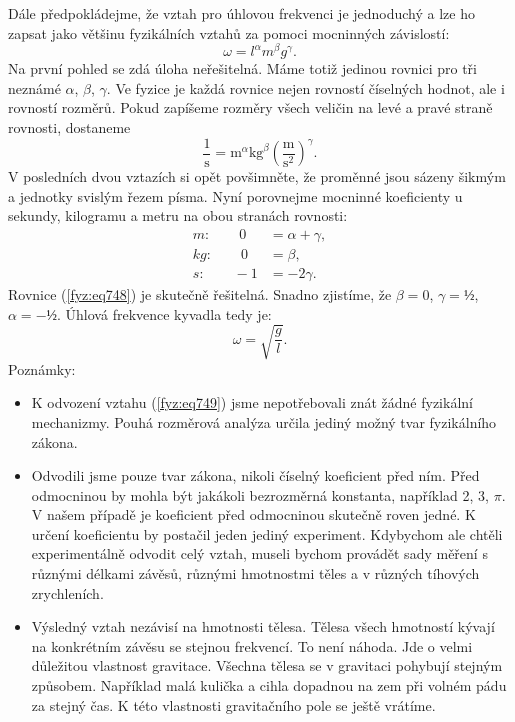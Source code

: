 \begin{mdframed}[style=mdexam]
\begin{example}
    Dále předpokládejme, že vztah pro úhlovou frekvenci je jednoduchý a lze ho zapsat jako většinu
    fyzikálních vztahů za pomoci mocninných závislostí:
    \begin{equation*}
      ω= l^\alpha m^\beta g^\gamma.     
    \end{equation*}
    Na první pohled se zdá úloha neřešitelná. Máme totiž jedinou rovnici pro tři neznámé \(α\),
    \(β\), \(γ\). Ve fyzice je každá rovnice nejen rovností číselných hodnot, ale i rovností
    rozměrů. Pokud zapíšeme rozměry všech veličin na levé a pravé straně rovnosti, dostaneme
    \begin{equation}\label{fyz:eq748}
      \dfrac{1}{\si{\s}} = \si{\m}^α\si{\kg}^β\left(\dfrac{\si{\m}}{\si{\square\s}}\right)^γ.
    \end{equation}
    V posledních dvou vztazích si opět povšimněte, že proměnné jsou sázeny šikmým a jednotky
    svislým řezem písma. Nyní porovnejme mocninné koeficienty u sekundy, kilogramu a metru
    na obou stranách rovnosti:
    \begin{align*}
      \si{m}:  \qquad 0 &= α + γ, \\
      \si{kg}: \qquad 0 &= β,     \\
      \si{s}:  \qquad-1 &= -2γ.
    \end{align*}
    Rovnice (\ref{fyz:eq748}) je skutečně řešitelná. Snadno zjistíme, že \(β = 0\), \(γ = ½\), \(α =
    −½\). Úhlová frekvence kyvadla tedy je: 
    \begin{equation}\label{fyz:eq749}
      ω=\sqrt{\dfrac{g}{l}}.
    \end{equation}
    Poznámky:
    \begin{itemize}[noitemsep]
      \item K odvození vztahu (\ref{fyz:eq749}) jsme nepotřebovali znát žádné fyzikální mechanizmy.
            Pouhá rozměrová analýza určila jediný možný tvar fyzikálního zákona.
      \item Odvodili jsme pouze tvar zákona, nikoli číselný koeficient před ním. Před odmocninou by
            mohla být jakákoli bezrozměrná konstanta, například \num{2}, \num{3}, \(π\). V našem
            případě je koeficient před odmocninou skutečně roven jedné. K určení koeficientu by
            postačil jeden jediný experiment. Kdybychom ale chtěli experimentálně odvodit celý
            vztah, museli bychom provádět sady měření s různými délkami závěsů, různými hmotnostmi
            těles a v různých tíhových zrychleních.
      \item Výsledný vztah nezávisí na hmotnosti tělesa. Tělesa všech hmotností kývají na konkrétním
            závěsu se stejnou frekvencí. To není náhoda. Jde o velmi důležitou vlastnost gravitace.
            Všechna tělesa se v gravitaci pohybují stejným způsobem. Například malá kulička a cihla
            dopadnou na zem při volném pádu za stejný čas. K této vlastnosti gravitačního pole se
            ještě vrátíme. 
    \end{itemize}
  \end{example}
\end{mdframed}